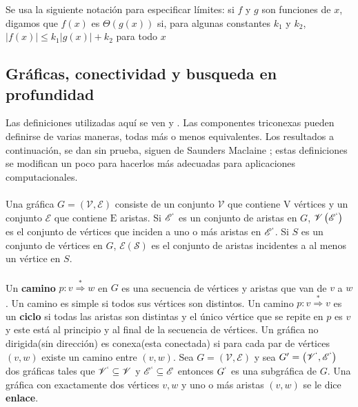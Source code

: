 Se usa la siguiente notación para especificar límites: si $f$ y $g$ son funciones de $x$, digamos que $f\left(x\right)$ es $\Theta\left(g\left(x\right)\right)$ si, para algunas constantes $k_{1}$ y $k_{2}$, $\left|f\left(x\right)\right| \leq k_{1}\left|g\left(x\right)\right| + k_{2}$ para todo $x$\\

\subsection{Gráficas, conectividad y busqueda en profundidad}

Las definiciones utilizadas aquí se ven \citep{busacker1965finite} y \citep{harary1971graph}. Las componentes triconexas pueden definirse de varias maneras, todas más o menos equivalentes. Los resultados a continuación, se dan sin prueba, siguen de Saunders Maclaine \citep{mac-lane-1937}; estas definiciones se modifican un poco para hacerlos más adecuadas para aplicaciones computacionales.\\

\paragraph{}
Una gráfica $G = \left(\mathscr{V},\mathscr{E}\right)$ consiste de un conjunto $\mathscr{V}$ que contiene $\mathrm{V}$ vértices y un conjunto $\mathscr{E}$ que contiene $\mathrm{E}$ aristas. Si $\mathscr{E}^{`}$ es un conjunto de aristas en $G$, $\mathscr{V}\left(\mathscr{E}^{`}\right)$ es el conjunto de vértices que inciden a uno o más aristas en $\mathscr{E}^{`}$. Si $S$ es un conjunto de vértices en $G$, $\mathscr{E}\left(\mathscr{S}\right)$  es el conjunto de aristas incidentes a al menos un vértice en $S$.

\paragraph{}
Un \textbf{camino} $p:v \overset{\ast}{\Rightarrow} w$ en $G$ es una secuencia de vértices y aristas que van de $v$ a $w$. Un camino es simple si todos sus vértices son distintos. Un camino $p:v \overset{\ast}{\Rightarrow} v$ es un \textbf{ciclo} si todas las aristas son distintas y el único vértice que se repite en $p$ es $v$ y este está al principio y al final de la secuencia de vértices. Un gráfica no dirigida(sin dirección) es conexa(esta conectada) si para cada par de vértices $(v, w)$ existe un camino entre $(v,w)$. Sea $G= \left(\mathscr{V},\mathscr{E}\right)$ y sea $G' =  \left(\mathscr{V}^{`},\mathscr{E}^{`}\right)$ dos gráficas tales que $\mathscr{V}^{`}\subseteq\mathscr{V}$ y $\mathscr{E}^{`}\subseteq \mathscr{E}$ entonces $G^{`}$ es una subgráfica de $G$. Una gráfica con exactamente dos vértices $v,w$ y uno o más aristas $\left(v,w\right)$ se le dice \textbf{enlace}.

